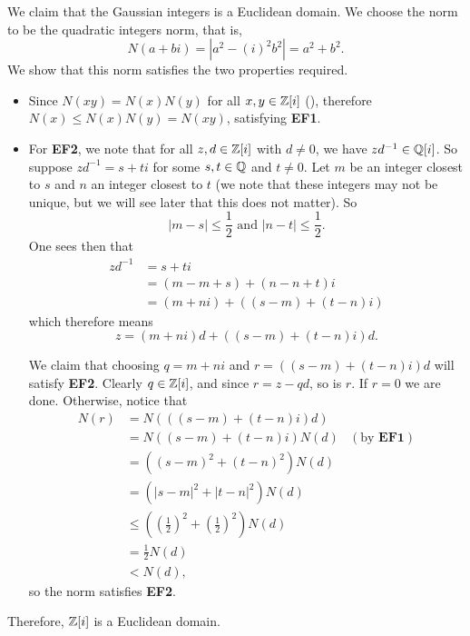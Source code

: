 \begin{example}\label{example-gaussian-integers-is-euclidean-domain}
    We claim that the Gaussian integers is a Euclidean domain. We choose the norm to be the quadratic integers norm, that is,
    \[
        N(a+bi) = \left|a^2 - (i)^2b^2\right| = a^2+b^2.
    \]
    We show that this norm satisfies the two properties required.
    \begin{itemize}
        \item Since $N(xy) = N(x)N(y)$ for all $x,y \in \mathbb{Z}[i]$ (), therefore $N(x) \leq N(x)N(y) = N(xy)$, satisfying \textbf{EF1}.

        \item For \textbf{EF2}, we note that for all $z, d \in \mathbb{Z}[i]$ with $d \neq 0$, we have $zd^{-1} \in \mathbb{Q}[i]$. So suppose $zd^{-1} = s + ti$ for some $s,t \in \mathbb{Q}$ and $t \neq 0$. Let $m$ be an integer closest to $s$ and $n$ an integer closest to $t$ (we note that these integers may not be unique, but we will see later that this does not matter). So
        \[
            |m - s| \leq \frac12 \text{ and } |n - t| \leq \frac12.
        \]
        One sees then that
        \begin{align*}
            zd^{-1} &= s + ti\\
            &= (m - m + s) + (n - n + t)i\\
            &= (m+ni) + \left((s-m) + (t-n)i\right)
        \end{align*}
        which therefore means
        \[
            z = (m+ni)d + \left((s-m) + (t-n)i\right)d.
        \]

        We claim that choosing $q = m + ni$ and $r = \left((s-m) + (t-n)i\right)d$ will satisfy \textbf{EF2}. Clearly $q \in \mathbb{Z}[i]$, and since $r = z - qd$, so is $r$. If $r = 0$ we are done. Otherwise, notice that
        \begin{align*}
            N(r) &= N\left(\left((s-m) + (t-n)i\right)d\right)\\
            &= N((s-m) + (t-n)i)N(d) & (\text{by }\textbf{EF1})\\
            &= \left((s-m)^2 + (t-n)^2\right) N(d)\\
            &= \left(|s-m|^2 + |t-n|^2\right) N(d)\\
            &\leq \left(\left(\frac12\right)^2 + \left(\frac12\right)^2\right)N(d)\\
            &= \frac12 N(d)\\
            &< N(d),
        \end{align*}
        so the norm satisfies \textbf{EF2}.
    \end{itemize}
    Therefore, $\mathbb{Z}[i]$ is a Euclidean domain.
\end{example}

